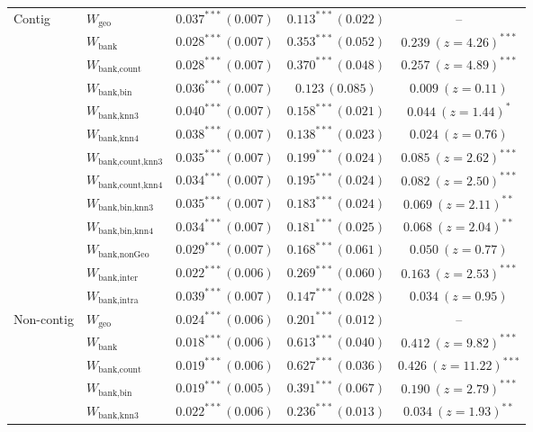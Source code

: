 \begin{table}[htbp]
\begin{tabular}{llccc}
    \addlinespace
    Contig & $W_{\text{geo}}$ & $0.037^{***}\,(0.007)$ & $0.113^{***}\,(0.022)$ & -- \\
     & $W_{\text{bank}}$ & $0.028^{***}\,(0.007)$ & $0.353^{***}\,(0.052)$ & $0.239\ (z{=}4.26)^{***}$ \\
     & $W_{\text{bank,count}}$ & $0.028^{***}\,(0.007)$ & $0.370^{***}\,(0.048)$ & $0.257\ (z{=}4.89)^{***}$ \\
     & $W_{\text{bank,bin}}$ & $0.036^{***}\,(0.007)$ & $0.123\,(0.085)$ & $0.009\ (z{=}0.11)$ \\
     & $W_{\text{bank,knn3}}$ & $0.040^{***}\,(0.007)$ & $0.158^{***}\,(0.021)$ & $0.044\ (z{=}1.44)^{*}$ \\
     & $W_{\text{bank,knn4}}$ & $0.038^{***}\,(0.007)$ & $0.138^{***}\,(0.023)$ & $0.024\ (z{=}0.76)$ \\
     & $W_{\text{bank,count,knn3}}$ & $0.035^{***}\,(0.007)$ & $0.199^{***}\,(0.024)$ & $0.085\ (z{=}2.62)^{***}$ \\
     & $W_{\text{bank,count,knn4}}$ & $0.034^{***}\,(0.007)$ & $0.195^{***}\,(0.024)$ & $0.082\ (z{=}2.50)^{***}$ \\
     & $W_{\text{bank,bin,knn3}}$ & $0.035^{***}\,(0.007)$ & $0.183^{***}\,(0.024)$ & $0.069\ (z{=}2.11)^{**}$ \\
     & $W_{\text{bank,bin,knn4}}$ & $0.034^{***}\,(0.007)$ & $0.181^{***}\,(0.025)$ & $0.068\ (z{=}2.04)^{**}$ \\
     & $W_{\text{bank,nonGeo}}$ & $0.029^{***}\,(0.007)$ & $0.168^{***}\,(0.061)$ & $0.050\ (z{=}0.77)$ \\
     & $W_{\text{bank,inter}}$ & $0.022^{***}\,(0.006)$ & $0.269^{***}\,(0.060)$ & $0.163\ (z{=}2.53)^{***}$ \\
     & $W_{\text{bank,intra}}$ & $0.039^{***}\,(0.007)$ & $0.147^{***}\,(0.028)$ & $0.034\ (z{=}0.95)$ \\
    \addlinespace
    Non-contig & $W_{\text{geo}}$ & $0.024^{***}\,(0.006)$ & $0.201^{***}\,(0.012)$ & -- \\
     & $W_{\text{bank}}$ & $0.018^{***}\,(0.006)$ & $0.613^{***}\,(0.040)$ & $0.412\ (z{=}9.82)^{***}$ \\
     & $W_{\text{bank,count}}$ & $0.019^{***}\,(0.006)$ & $0.627^{***}\,(0.036)$ & $0.426\ (z{=}11.22)^{***}$ \\
     & $W_{\text{bank,bin}}$ & $0.019^{***}\,(0.005)$ & $0.391^{***}\,(0.067)$ & $0.190\ (z{=}2.79)^{***}$ \\
     & $W_{\text{bank,knn3}}$ & $0.022^{***}\,(0.006)$ & $0.236^{***}\,(0.013)$ & $0.034\ (z{=}1.93)^{**}$ \\

\end{tabular}
\end{table}
